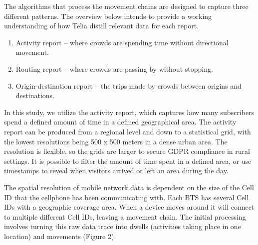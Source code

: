 \documentclass[authordate,empirical, issue]{jote-new-article}
\begin{document}
The algorithms that process the movement chains are designed to capture three different patterns. The overview below intends to provide a working understanding of how Telia distill relevant data for each report.





\begin{enumerate}


  \item Activity report – where crowds are spending time without directional movement.



  \item Routing report – where crowds are passing by without stopping.



  \item Origin-destination report – the trips made by crowds between origins and destinations.


\end{enumerate}





In this study, we utilize the activity report, which captures how many subscribers spend a defined amount of time in a defined geographical area. The activity report can be produced from a regional level and down to a statistical grid, with the lowest resolutions being 500 x 500 meters in a dense urban area. The resolution is flexible, so the grids are larger to secure GDPR compliance in rural settings. It is possible to filter the amount of time spent in a defined area, or use timestamps to reveal when visitors arrived or left an area during the day.







The spatial resolution of mobile network data is dependent on the size of the Cell ID that the cellphone has been communicating with. Each BTS has several Cell IDs with a geographic coverage area. When a device moves around it will connect to multiple different Cell IDs, leaving a movement chain. The initial processing involves turning this raw data trace into dwells (activities taking place in one location) and movements (Figure 2).
\end{document}
